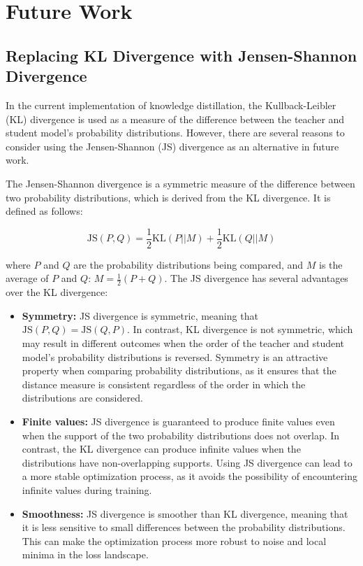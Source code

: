 \documentclass{article} %
\begin{document}
\section{Future Work}
\subsection{Replacing KL Divergence with Jensen-Shannon Divergence}
In the current implementation of knowledge distillation, the Kullback-Leibler (KL) divergence is used as a measure of the difference between the teacher and student model's probability distributions. However, there are several reasons to consider using the Jensen-Shannon (JS) divergence as an alternative in future work.

The Jensen-Shannon divergence is a symmetric measure of the difference between two probability distributions, which is derived from the KL divergence. It is defined as follows:

\begin{equation}
\text{JS}(P, Q) = \frac{1}{2} \text{KL}(P || M) + \frac{1}{2} \text{KL}(Q || M)
\end{equation}

where $P$ and $Q$ are the probability distributions being compared, and $M$ is the average of $P$ and $Q$: $M = \frac{1}{2}(P + Q)$. The JS divergence has several advantages over the KL divergence:
\begin{itemize}
    \item \textbf{Symmetry:} JS divergence is symmetric, meaning that $\text{JS}(P, Q) = \text{JS}(Q, P)$. In contrast, KL divergence is not symmetric, which may result in different outcomes when the order of the teacher and student model's probability distributions is reversed. Symmetry is an attractive property when comparing probability distributions, as it ensures that the distance measure is consistent regardless of the order in which the distributions are considered.
    \item \textbf{Finite values:} JS divergence is guaranteed to produce finite values even when the support of the two probability distributions does not overlap. In contrast, the KL divergence can produce infinite values when the distributions have non-overlapping supports. Using JS divergence can lead to a more stable optimization process, as it avoids the possibility of encountering infinite values during training.
    \item \textbf{Smoothness:} JS divergence is smoother than KL divergence, meaning that it is less sensitive to small differences between the probability distributions. This can make the optimization process more robust to noise and local minima in the loss landscape.
\end{itemize}
\end{document}
